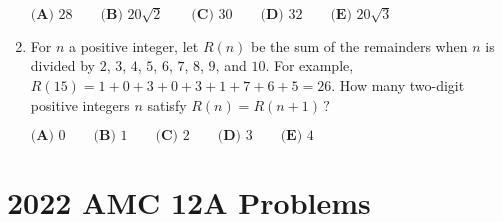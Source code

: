 \documentclass{article}
\begin{document}
\begin{enumerate}[label=\arabic*., itemsep=0.5em]
\(\textbf{(A) } 28 \qquad \textbf{(B) } 20\sqrt{2} \qquad \textbf{(C) } 30 \qquad \textbf{(D) } 32 \qquad \textbf{(E) } 20\sqrt{3}\)\par \vspace{0.5em}\item For \(n\) a positive integer, let \(R(n)\) be the sum of the remainders when \(n\) is divided by \(2\), \(3\), \(4\), \(5\), \(6\), \(7\), \(8\), \(9\), and \(10\). For example, \(R(15) = 1+0+3+0+3+1+7+6+5=26\). How many two-digit positive integers \(n\) satisfy \(R(n) = R(n+1)\,?\)

\(\textbf{(A) }0\qquad\textbf{(B) }1\qquad\textbf{(C) }2\qquad\textbf{(D) }3\qquad\textbf{(E) }4\)\par \vspace{0.5em}
\end{enumerate}
\newpage\section*{2022 AMC 12A Problems}
\end{document}
